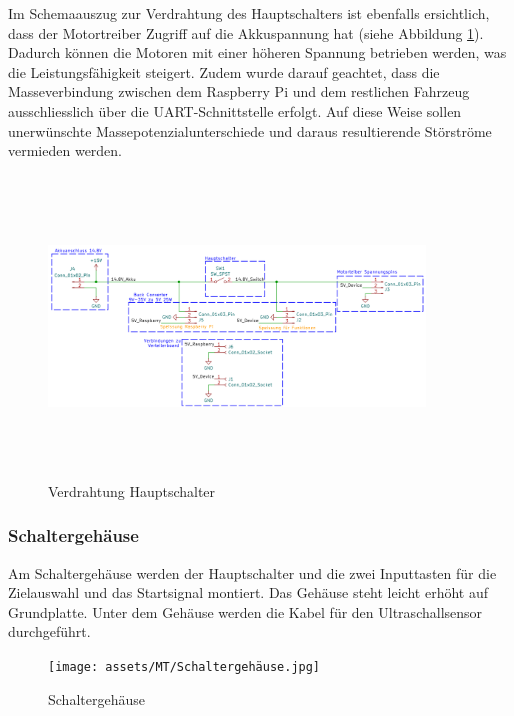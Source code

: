 Im Schemaauszug zur Verdrahtung des Hauptschalters ist ebenfalls ersichtlich, dass der Motortreiber Zugriff auf die Akkuspannung hat (siehe Abbildung \ref{fig: Verdrahtung Hauptschalter}). Dadurch können die Motoren mit einer höheren Spannung betrieben werden, was die Leistungsfähigkeit steigert. Zudem wurde darauf geachtet, dass die Masseverbindung zwischen dem Raspberry Pi und dem restlichen Fahrzeug ausschliesslich über die UART-Schnittstelle erfolgt. Auf diese Weise sollen unerwünschte Massepotenzialunterschiede und daraus resultierende Störströme vermieden werden.

\begin{figure}[H]
\centering
\includegraphics[width=10cm, height=8cm]{assets/ET/PINOUT/Speissung.png}
\caption{Verdrahtung Hauptschalter}
\label{fig: Verdrahtung Hauptschalter}
\end{figure}

\subsubsection{Schaltergehäuse}

Am Schaltergehäuse werden der Hauptschalter und die zwei Inputtasten für die Zielauswahl und das Startsignal montiert. Das Gehäuse steht leicht erhöht auf Grundplatte. Unter dem Gehäuse werden die Kabel für den Ultraschallsensor durchgeführt.



\begin{figure}[H]
\centering
\texttt{[image: assets/MT/Schaltergehäuse.jpg]}
\caption{Schaltergehäuse}
\label{fig:Schaltergehäuse}
\end{figure}

